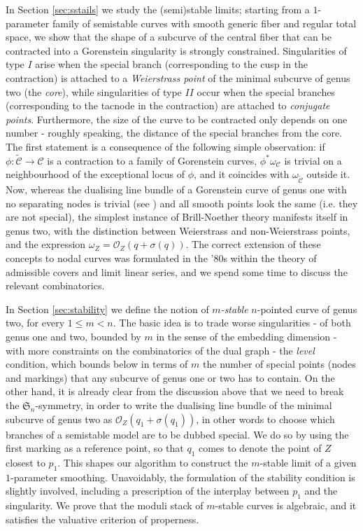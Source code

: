 \documentclass[11pt]{amsart}
\newcommand{\OO}{\mathcal O}
\renewcommand{\to}{\rightarrow}
\theoremstyle{plain}
\theoremstyle{definition}
\begin{document}
In Section \ref{sec:sstails} we study the (semi)stable limits; starting from a $1$-parameter family of semistable curves with smooth generic fiber and regular total space, we show that the shape of a subcurve of the central fiber that can be contracted into a Gorenstein singularity is strongly constrained. Singularities of type $I$ arise when the special branch (corresponding to the cusp in the contraction) is attached to a \emph{Weierstrass point} of the minimal subcurve of genus two (the \emph{core}), while singularities of type $I\!I$ occur when the special branches (corresponding to the tacnode in the contraction) are attached to \emph{conjugate points}. Furthermore, the size of the curve to be contracted only depends on one number - roughly speaking, the distance of the special branches from the core. The first statement is a consequence of the following simple observation: if $\phi\colon\widetilde{\mathcal C}\to\mathcal C$ is a contraction to a family of Gorenstein curves, $\phi^*\omega_{\mathcal C}$ is trivial on a neighbourhood of the exceptional locus of $\phi$, and it coincides with $\omega_{\widetilde{\mathcal C}}$ outside it. Now, whereas the dualising line bundle of a Gorenstein curve of genus one with no separating nodes is trivial (see \cite[Lemma 3.3]{SMY1}) and all smooth points look the same (i.e. they are not special), the simplest instance of Brill-Noether theory manifests itself in genus two, with the distinction between Weierstrass and non-Weierstrass points, and the expression $\omega_Z=\OO_Z(q+\sigma(q))$. The correct extension of these concepts to nodal curves was formulated in the '80s within the theory of admissible covers and limit linear series, and we spend some time to discuss the relevant combinatorics.

In Section \ref{sec:stability} we define the notion of \emph{$m$-stable} $n$-pointed curve of genus two, for every $1\leq m<n$. The basic idea is to trade worse singularities - of both genus one and two, bounded by $m$ in the sense of the embedding dimension - with more constraints on the combinatorics of the dual graph - the \emph{level} condition, which bounds below in terms of $m$ the number of special points (nodes and markings) that any subcurve of genus one or two has to contain. On the other hand, it is already clear from the discussion above that we need to break the $\mathfrak S_n$-symmetry, in order to write the dualising line bundle of the minimal subcurve of genus two as $\OO_Z(q_1+\sigma(q_1))$, in other words to choose which branches of a semistable model are to be dubbed special. We do so by using the first marking as a reference point, so that $q_1$ comes to denote the point of $Z$ closest to $p_1$. This shapes our algorithm to construct the $m$-stable limit of a given $1$-parameter smoothing. Unavoidably, the formulation of the stability condition is slightly involved, including a prescription of the interplay between $p_1$ and the singularity. We prove that the moduli stack of $m$-stable curves is algebraic, and it satisfies the valuative criterion of properness.
\end{document}
